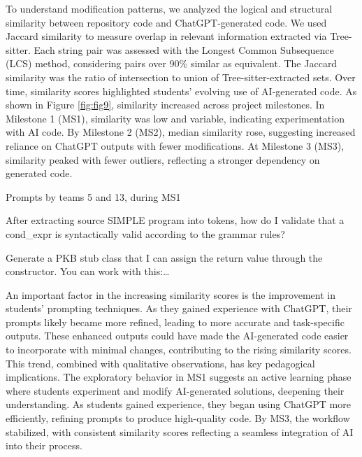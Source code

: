 To understand modification patterns, we analyzed the logical and structural similarity between repository code and ChatGPT-generated code. We used Jaccard similarity to measure overlap in relevant information extracted via Tree-sitter. Each string pair was assessed with the Longest Common Subsequence (LCS) method, considering pairs over 90\% similar as equivalent. The Jaccard similarity was the ratio of intersection to union of Tree-sitter-extracted sets. Over time, similarity scores highlighted students' evolving use of AI-generated code. As shown in Figure \ref{fig:fig9}, similarity increased across project milestones. In Milestone 1 (MS1), similarity was low and variable, indicating experimentation with AI code. By Milestone 2 (MS2), median similarity rose, suggesting increased reliance on ChatGPT outputs with fewer modifications. At Milestone 3 (MS3), similarity peaked with fewer outliers, reflecting a stronger dependency on generated code.

\begin{chatgroup}{Prompts by teams 5 and 13, during MS1}
    \begin{chatbubble}
    \scriptsize
    After extracting source SIMPLE program into tokens, how do I validate that a cond\_expr is syntactically valid according to the grammar rules?
    \end{chatbubble}
    \begin{chatbubble}
     \scriptsize
    Generate a PKB stub class that I can assign the return value through the constructor. You can work with this:…
    \end{chatbubble}
\end{chatgroup}

An important factor in the increasing similarity scores is the improvement in students' prompting techniques. As they gained experience with ChatGPT, their prompts likely became more refined, leading to more accurate and task-specific outputs. These enhanced outputs could have made the AI-generated code easier to incorporate with minimal changes, contributing to the rising similarity scores. This trend, combined with qualitative observations, has key pedagogical implications. The exploratory behavior in MS1 suggests an active learning phase where students experiment and modify AI-generated solutions, deepening their understanding. As students gained experience, they began using ChatGPT more efficiently, refining prompts to produce high-quality code. By MS3, the workflow stabilized, with consistent similarity scores reflecting a seamless integration of AI into their process.


